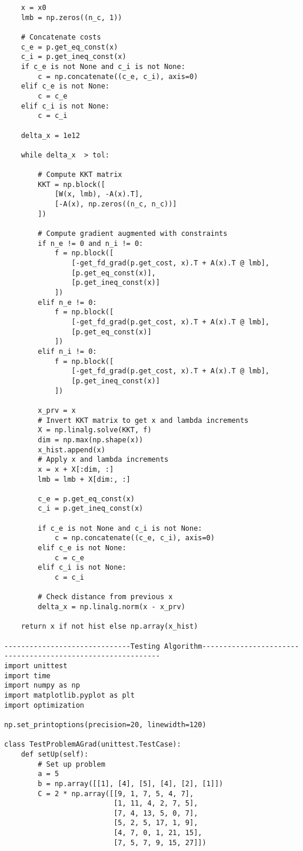 \begin{lstlisting}
    x = x0
    lmb = np.zeros((n_c, 1))

    # Concatenate costs
    c_e = p.get_eq_const(x)
    c_i = p.get_ineq_const(x)
    if c_e is not None and c_i is not None:
        c = np.concatenate((c_e, c_i), axis=0)
    elif c_e is not None:
        c = c_e
    elif c_i is not None:
        c = c_i

    delta_x = 1e12

    while delta_x  > tol:

        # Compute KKT matrix
        KKT = np.block([
            [W(x, lmb), -A(x).T],
            [-A(x), np.zeros((n_c, n_c))]
        ])

        # Compute gradient augmented with constraints
        if n_e != 0 and n_i != 0:
            f = np.block([
                [-get_fd_grad(p.get_cost, x).T + A(x).T @ lmb],
                [p.get_eq_const(x)],
                [p.get_ineq_const(x)]
            ])
        elif n_e != 0:
            f = np.block([
                [-get_fd_grad(p.get_cost, x).T + A(x).T @ lmb],
                [p.get_eq_const(x)]
            ])
        elif n_i != 0:
            f = np.block([
                [-get_fd_grad(p.get_cost, x).T + A(x).T @ lmb],
                [p.get_ineq_const(x)]
            ])

        x_prv = x
        # Invert KKT matrix to get x and lambda increments
        X = np.linalg.solve(KKT, f)
        dim = np.max(np.shape(x))
        x_hist.append(x)
        # Apply x and lambda increments
        x = x + X[:dim, :]
        lmb = lmb + X[dim:, :]

        c_e = p.get_eq_const(x)
        c_i = p.get_ineq_const(x)

        if c_e is not None and c_i is not None:
            c = np.concatenate((c_e, c_i), axis=0)
        elif c_e is not None:
            c = c_e
        elif c_i is not None:
            c = c_i

        # Check distance from previous x
        delta_x = np.linalg.norm(x - x_prv)

    return x if not hist else np.array(x_hist)
    
------------------------------Testing Algorithm------------------------------------------------------------
import unittest
import time
import numpy as np
import matplotlib.pyplot as plt
import optimization

np.set_printoptions(precision=20, linewidth=120)

class TestProblemAGrad(unittest.TestCase):
    def setUp(self):
        # Set up problem
        a = 5
        b = np.array([[1], [4], [5], [4], [2], [1]])
        C = 2 * np.array([[9, 1, 7, 5, 4, 7],
                          [1, 11, 4, 2, 7, 5],
                          [7, 4, 13, 5, 0, 7],
                          [5, 2, 5, 17, 1, 9],
                          [4, 7, 0, 1, 21, 15],
                          [7, 5, 7, 9, 15, 27]])


\end{lstlisting}
